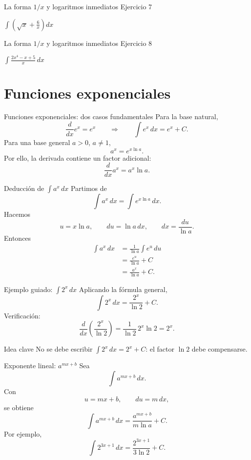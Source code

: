 \documentclass[10pt,aspectratio=169]{beamer}
\newcommand{\ejercicio}[1]{%
  \begin{center}
  \vfill
  {\fontsize{24}{30}\selectfont #1}
  \vfill
  \end{center}
}
\begin{document}
\begin{frame}{La forma $1/x$ y logaritmos inmediatos}
\small Ejercicio 7
\ejercicio{$\displaystyle \int\left(\sqrt{x}+\frac{6}{x}\right)dx$}
\end{frame}

\begin{frame}{La forma $1/x$ y logaritmos inmediatos}
\small Ejercicio 8
\ejercicio{$\displaystyle \int\frac{2x^4-x+5}{x}\,dx$}
\end{frame}

\section{Funciones exponenciales}

\begin{frame}{Funciones exponenciales: dos casos fundamentales}
\small
Para la base natural,
\[
\frac{d}{dx}e^x=e^x
\qquad\Longrightarrow\qquad
\boxed{\int e^x\,dx=e^x+C}.
\]
\pause
Para una base general $a>0$, $a\neq1$,
\[
a^x=e^{x\ln a}.
\]
Por ello, la derivada contiene un factor adicional:
\[
\boxed{\frac{d}{dx}a^x=a^x\ln a}.
\]
\end{frame}

\begin{frame}{Deducción de $\int a^x\,dx$}
\small
Partimos de
\[
\int a^x\,dx=\int e^{x\ln a}\,dx.
\]
Hacemos
\[
u=x\ln a,
\qquad du=\ln a\,dx,
\qquad dx=\frac{du}{\ln a}.
\]
Entonces
\[
\begin{aligned}
\int a^x\,dx
&=\frac{1}{\ln a}\int e^u\,du\\
&=\frac{e^u}{\ln a}+C\\
&=\boxed{\frac{a^x}{\ln a}+C}.
\end{aligned}
\]
\end{frame}

\begin{frame}{Ejemplo guiado: $\int 2^x\,dx$}
\small
Aplicando la fórmula general,
\[
\boxed{\int 2^x\,dx=\frac{2^x}{\ln2}+C}.
\]
\pause
Verificación:
\[
\frac{d}{dx}\left(\frac{2^x}{\ln2}\right)
=\frac{1}{\ln2}\,2^x\ln2
=2^x.
\]
\pause
\begin{block}{Idea clave}
No se debe escribir $\int 2^x\,dx=2^x+C$: el factor $\ln2$ debe compensarse.
\end{block}
\end{frame}

\begin{frame}{Exponente lineal: $a^{mx+b}$}
\small
Sea
\[
\int a^{mx+b}\,dx.
\]
Con
\[
u=mx+b,\qquad du=m\,dx,
\]
se obtiene
\[
\boxed{\int a^{mx+b}\,dx
=\frac{a^{mx+b}}{m\ln a}+C}.
\]
\pause
Por ejemplo,
\[
\int2^{3x+1}\,dx
=\boxed{\frac{2^{3x+1}}{3\ln2}+C}.
\]
\end{frame}
\end{document}
